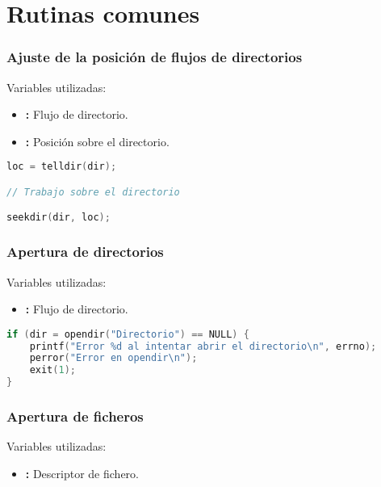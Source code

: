 \chapter{Rutinas comunes}

\subsection{Ajuste de la posición de flujos de directorios}

Variables utilizadas:

\begin{itemize}
	\item{}\textbf{:} Flujo de directorio.
	\item{}\textbf{:} Posición sobre el directorio.
\end{itemize}

\begin{lstlisting}[language=C]
loc = telldir(dir);

// Trabajo sobre el directorio

seekdir(dir, loc);
\end{lstlisting}

\subsection{Apertura de directorios}

Variables utilizadas:

\begin{itemize}
	\item{}\textbf{:} Flujo de directorio.
\end{itemize}

\begin{lstlisting}[language=C]
if (dir = opendir("Directorio") == NULL) {
	printf("Error %d al intentar abrir el directorio\n", errno);
	perror("Error en opendir\n");
	exit(1);
}
\end{lstlisting}

\subsection{Apertura de ficheros}

Variables utilizadas:

\begin{itemize}
	\item{}\textbf{:} Descriptor de fichero.
\end{itemize}

